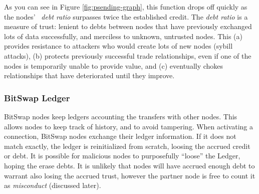 \documentclass{sig-alternate}
\begin{document}
As you can see in Figure \ref{fig:psending-graph}, this function drops off quickly as the nodes' \
\textit{debt ratio} surpasses twice the established credit.
The \textit{debt ratio} is a measure of trust:
lenient to debts between nodes that have previously exchanged lots of data
successfully, and merciless to unknown, untrusted nodes. This
(a) provides resistance to attackers who would create lots of new nodes
(sybill attacks),
(b) protects previously successful trade relationships, even if one of the
nodes is temporarily unable to provide value, and
(c) eventually chokes relationships that have deteriorated until they
improve.






\subsubsection{BitSwap Ledger}

BitSwap nodes keep ledgers accounting the transfers with other nodes. This allows nodes to keep track of history, and to avoid tampering. When activating a connection, BitSwap nodes exchange their ledger information. If it does not match exactly, the ledger is reinitialized from scratch, loosing the accrued credit or debt.  It is possible for malicious nodes to purposefully ``loose'' the Ledger, hoping the erase debts. It is unlikely that nodes will have accrued enough debt to warrant also losing the accrued trust, however the partner node is free to count it as \textit{misconduct} (discussed later).
\end{document}
